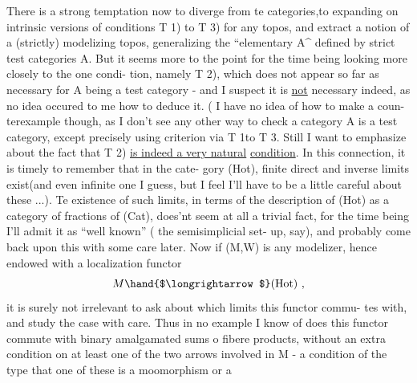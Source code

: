 There is a strong temptation now to diverge from te categories,\hand{\textbackslash}to
\margin{\unsure{--}}expanding on intrinsic versions of conditions  T 1) to T 3) for any topos,
and extract a notion of a (strictly) modelizing topos,  generalizing the
``elementary  A\^{} defined by strict test categories A.  But it seems
more to the point for the time being looking more closely to the one condi-%
tion,  namely T 2),  which does not appear so far as necessary for A being
a test category  -  and I suspect it is \uline{not} necessary indeed,  as no idea
occured to me how to deduce it\hand{(}\hand{)}. ( I have no idea of how to make a coun-%
terexample though,  as I don't see any other way to check a category A is
a test category,  except precisely using  criterion via T 1\hand{)}to T 3\hand{)}.\hand{)}
Still I want to emphasize about the fact that T 2) \uline{is indeed a very natural}
\uline{condition}.  In this connection,  it is timely to remember that in the cate-%
gory (Hot),  finite direct and inverse limits exist(and even infinite one
I guess,  but I feel I'll have to be a little careful about these ...).
Te existence of such limits,  in terms of the description of (Hot) as a
category of fractions of (Cat),  does'nt seem at all a trivial fact,  for
the time being I'll admit it as  ``well known'' ( the semisimplicial set-%
up,  say),  and probably come back upon this with some care later.  Now if
 (M,W) is any modelizer,  hence endowed with a localization functor
\[ M \hand{$\longrightarrow$} (\mathrm{Hot}) \ , \]
it is surely not irrelevant to ask about which limits this functor commu-%
tes with,  and study the case with care.  Thus in no  example I know of
does this functor commute with binary amalgamated sums o  fibere products,
without an extra condition on at least one of the two arrows involved in
M  -  a condition of the type that one of these is a moomorphism or a
